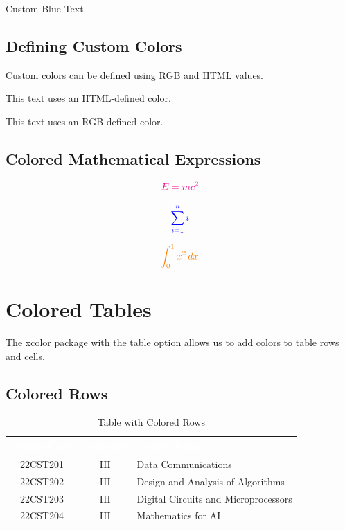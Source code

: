 \documentclass{article}
\begin{document}
\textcolor{myblue}{Custom Blue Text}

\subsection{Defining Custom Colors}

Custom colors can be defined using RGB and HTML values.

\textcolor{softpink}{This text uses an HTML-defined color.}

\textcolor{mygreen}{This text uses an RGB-defined color.}

\subsection{Colored Mathematical Expressions}

\[
\textcolor{magenta}{E=mc^2}
\]

\[
\textcolor{blue}{\sum_{i=1}^{n} i}
\]

\[
\textcolor{orange}{\int_0^1 x^2\,dx}
\]

\section{Colored Tables}

The xcolor package with the table option allows
us to add colors to table rows and cells.

\subsection{Colored Rows}

\begin{table}[h!]
    \centering
    \begin{tabular}{|c|c|l|}
        \hline
        \rowcolor{myblue}
        \textcolor{white}{\textbf{Course Code}} &
        \textcolor{white}{\textbf{Semester}} &
        \textcolor{white}{\textbf{Course Name}} \\
        \hline

        \rowcolor{blue!10}
        22CST201 & III & Data Communications \\
        \hline

        \rowcolor{green!15}
        22CST202 & III & Design and Analysis of Algorithms \\
        \hline

        \rowcolor{yellow!20}
        22CST203 & III & Digital Circuits and Microprocessors \\
        \hline

        22CST204 & III & Mathematics for AI \\
        \hline
    \end{tabular}
    \caption{Table with Colored Rows}
\end{table}
\end{document}
